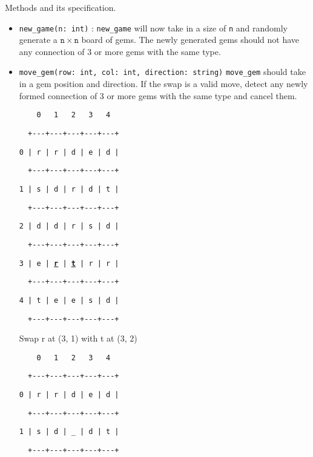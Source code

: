Methods and its specification.
\begin{itemize}
\item \texttt{new\_game(n: int)} : \texttt{new\_game} will now take in a
size of \texttt{n} and randomly generate a \texttt{$\mathtt{n}\times\mathtt{n}$}
board of gems. The newly generated gems should not have any connection
of 3 or more gems with the same type. 
\item \texttt{move\_gem(row: int, col: int, direction: string)} \texttt{move\_gem}
should take in a gem position and direction. If the swap is a valid
move, detect any newly formed connection of 3 or more gems with the
same type and cancel them. 

\noindent %
\begin{minipage}[t]{0.5\columnwidth}%
\texttt{~~~~0~~~1~~~2~~~3~~~4 }

\texttt{~~+-{}-{}-+-{}-{}-+-{}-{}-+-{}-{}-+-{}-{}-+ }

\texttt{0 | r | r | d | e | d |}

\texttt{~~+-{}-{}-+-{}-{}-+-{}-{}-+-{}-{}-+-{}-{}-+ }

\texttt{1 | s | d | r | d | t |}

\texttt{~~+-{}-{}-+-{}-{}-+-{}-{}-+-{}-{}-+-{}-{}-+ }

\texttt{2 | d | d | r | s | d |}

\texttt{~~+-{}-{}-+-{}-{}-+-{}-{}-+-{}-{}-+-{}-{}-+ }

\texttt{3 | e | }\texttt{\textbf{\uline{r}}}\texttt{ | }\texttt{\textbf{\uline{t}}}\texttt{
| r | r |}

\texttt{~~+-{}-{}-+-{}-{}-+-{}-{}-+-{}-{}-+-{}-{}-+ }

\texttt{4 | t | e | e | s | d |}

\texttt{~~+-{}-{}-+-{}-{}-+-{}-{}-+-{}-{}-+-{}-{}-+}

Swap \textquotedbl r\textquotedbl{} at (3, 1) with \textquotedbl t\textquotedbl{}
at (3, 2)%
\end{minipage}%
\begin{minipage}[t]{0.5\columnwidth}%
\texttt{~~~~0~~~1~~~2~~~3~~~4 }

\texttt{~~+-{}-{}-+-{}-{}-+-{}-{}-+-{}-{}-+-{}-{}-+}

\texttt{0 | r | r | d | e | d | }

\texttt{~~+-{}-{}-+-{}-{}-+-{}-{}-+-{}-{}-+-{}-{}-+ }

\texttt{1 | s | d | \_ | d | t |}

\texttt{~~+-{}-{}-+-{}-{}-+-{}-{}-+-{}-{}-+-{}-{}-+ }


\end{minipage}
\end{itemize}
